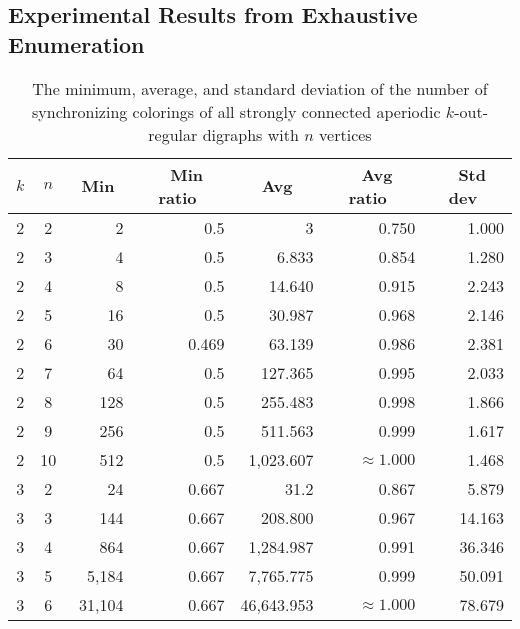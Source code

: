 \documentclass[runningheads]{llncs}
\begin{document}
\subsection{Experimental Results from Exhaustive Enumeration}

\begin{table}
\caption{The minimum, average, and standard deviation of the number of synchronizing colorings of all strongly connected aperiodic $k$-out-regular digraphs with $n$ vertices}
\label{tab:exhaustive_results_1}
\begin{center}
\begin{tabular}{|c|c|r|r|r|r|r|}
  \hline
  $k$&$n$&\multicolumn{1}{c|}{\ Min\ }&\multicolumn{1}{c|}{\ Min ratio\ }&\multicolumn{1}{c|}{\ Avg\ }& \multicolumn{1}{c|}{\ Avg ratio\ } &\multicolumn{1}{c|}{\ Std dev\ } \\ \hline\hline
  2 & 2  &  2         & 0.5       & 3               & 0.750           & 1.000  \\ \hline  
  2 & 3  &  4         & 0.5       & 6.833           & 0.854           & 1.280  \\ \hline
  2 & 4  &  8         & 0.5       & 14.640          & 0.915           & 2.243  \\ \hline  
  2 & 5  &  16        & 0.5       & 30.987          & 0.968           & 2.146  \\ \hline  
  2 & 6  &  30        & 0.469     & 63.139          & 0.986           & 2.381  \\ \hline
  2 & 7  &  64        & 0.5       & 127.365         & 0.995           & 2.033  \\ \hline  
  2 & 8  &  128       & 0.5       & 255.483         & 0.998           & 1.866  \\ \hline  
  2 & 9  &  256       & 0.5       & 511.563         & 0.999           & 1.617  \\ \hline  
  2 & 10 &  512       & 0.5       & 1,023.607       & $\approx 1.000$ & 1.468  \\ \hline
  3 & 2  &   24       & 0.667     & 31.2            & 0.867           & 5.879  \\ \hline 
  3 & 3  &  144       & 0.667     & 208.800         & 0.967           & 14.163  \\ \hline 
  3 & 4  &  864       & 0.667     & 1,284.987       & 0.991           & 36.346  \\ \hline 
  3 & 5  & 5,184      & 0.667     & 7,765.775       & 0.999           & 50.091  \\ \hline 
  3 & 6  & 31,104     & 0.667     & 46,643.953      & $\approx 1.000$ & 78.679  \\ \hline 

\end{tabular}
\end{center}
\end{table}
\end{document}
